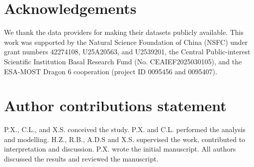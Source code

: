\documentclass[preprint,review,12pt,authoryear]{elsarticle}
\begin{document}
\begin{table}[p]
\small
\centering
\caption{Classification criteria for different surface types}\label{tab:table2}
\end{table}

\clearpage
\nolinenumbers


\section*{Acknowledgements}
We thank the data providers for making their datasets publicly available. This work was supported by the Natural Science Foundation of China (NSFC) under grant numbers 42274108, U25A20563, and U2539201, the Central Public-interest Scientific Institution Basal Research Fund (No. CEAIEF2025030105), and the ESA-MOST Dragon 6 cooperation (project ID 0095456 and 0095407).

\section*{Author contributions statement}
P.X., C.L., and X.S. conceived the study. P.X. and C.L. performed the analysis and modelling. H.Z., R.B., A.D.S and X.S. supervised the work, contributed to interpretation and discussion. P.X. wrote the initial manuscript. All authors discussed the results and reviewed the manuscript.
\end{document}
